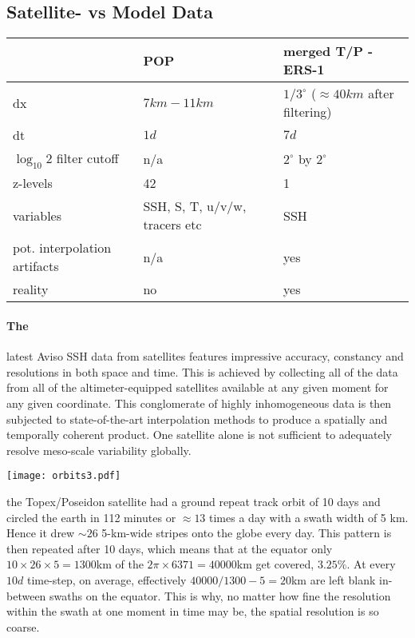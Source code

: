 \subsection{Satellite- vs Model Data} \label{subsec:satvsmod}
\begin{margintable}
\begin{tabularx}{\textwidth}{ |X|X|X| }
  \hline
   & \bf{POP} & \bf{merged T/P - ERS-1 }  \\
  \hline
  dx & $7km-11km$  & $1/3^{\circ}$ ($\approx 40 km$ after filtering)  \\
  \hline
  dt & $1d$  & $7d$  \\
  \hline
  $\log_{10}2$ filter cutoff & n/a  & $2^{\circ} $ by $ 2^{\circ} $  \\
  \hline
  z-levels & 42  & 1  \\
  \hline
  variables & SSH, S, T, u/v/w, tracers etc & SSH  \\
  \hline
	pot. interpolation artifacts & n/a  & yes  \\
  \hline
	reality & no  & yes  \\
  \hline
\end{tabularx}
\label{table:modVSsat}
\end{margintable}

\paragraph{The } latest Aviso SSH data from satellites features impressive accuracy, constancy and resolutions in both space and time. This is achieved
by collecting all of the data from all of the altimeter-equipped satellites available at any given moment for any given coordinate. This conglomerate of highly
inhomogeneous data is then subjected to state-of-the-art interpolation methods to produce a spatially and temporally coherent product. One satellite alone is
not sufficient to adequately resolve meso-scale variability globally. 
\begin{marginfigure}
\texttt{[image: orbits3.pdf]}
\end{marginfigure}
\Eg the Topex/Poseidon satellite had a ground repeat track orbit of 10 days and circled the earth in 112 minutes or $\approx 13$ times a day with a swath width of 5 km. Hence it drew $\sim 26$ 5-km-wide stripes onto the globe every day.
This pattern is then repeated after 10 days, which means that at the equator only $10 \times 26 \times 5=1300$km of the $2\pi \times 6371=40000$km get covered,
\ie $3.25\%$. At every $10d$ time-step, on average, effectively
$40000/1300-5= 20$km are left blank in-between swaths on the equator. This is why, no matter how fine the resolution within the swath at one moment in time may
be, the spatial resolution is so coarse.

